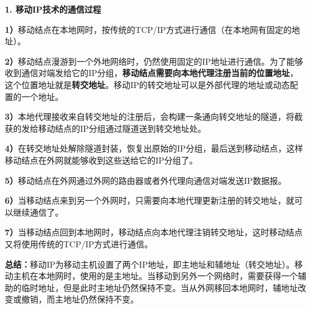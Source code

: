 \textbf{{1. 移动IP技术的通信过程}}

\textbf{1）}移动结点在本地网时，按传统的TCP/IP方式进行通信（在本地网有固定的地址）。

\textbf{2）}移动结点漫游到一个外地网络时，仍然使用固定的IP地址进行通信。为了能够收到通信对端发给它的IP分组，\textbf{移动结点需要向本地代理注册当前的位置地址}，这个位置地址就是\textbf{转交地址}。移动IP的转交地址可以是外部代理的地址或动态配置的一个地址。

\textbf{3）}本地代理接收来自转交地址的注册后，会构建一条通向转交地址的隧道，将截获的发给移动结点的IP分组通过隧道送到转交地址处。

\textbf{4）}在转交地址处解除隧道封装，恢复出原始的IP分组，最后送到移动结点，这样移动结点在外网就能够收到这些送给它的IP分组了。

\textbf{5）}移动结点在外网通过外网的路由器或者外代理向通信对端发送IP数据报。

\textbf{6）}当移动结点来到另一个外网时，只需要向本地代理更新注册的转交地址，就可以继续通信了。

\textbf{7）}当移动结点回到本地网时，移动结点向本地代理注销转交地址，这时移动结点又将使用传统的TCP/IP方式进行通信。

{\textbf{总结：}}移动IP为移动主机设置了两个IP地址，即主地址和辅地址（转交地址）。移动主机在本地网时，使用的是主地址。当移动到另外一个网络时，需要获得一个辅助的临时地址，但是此时主地址仍然保持不变。当从外网移回本地网时，辅地址改变或撤销，而主地址仍然保持不变。\\
